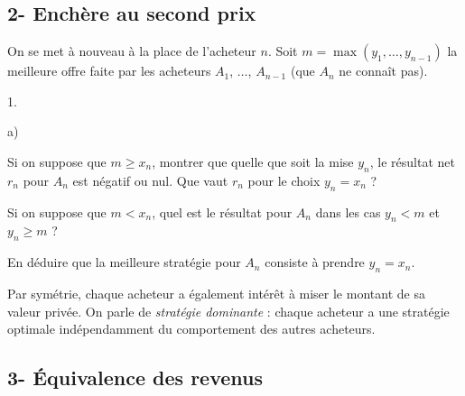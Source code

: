 \documentclass[11pt]{article}%
\begin{document}



\subsection*{2- Enchère au second prix}

\noindent
On se met à nouveau à la place de l'acheteur $n$. Soit $m = \max(y_1, 
\ldots, y_{n-1})$ la meilleure offre faite par les acheteurs $A_1$, 
$\ldots$, $A_{n-1}$ (que $A_n$ ne connaît pas).
\begin{noliste}{1.}
  \setlength{\itemsep}{4mm}
  \setcounter{enumi}{11}
  \item \begin{noliste}{a)}
    \setlength{\itemsep}{2mm}
    \item Si on suppose que $m \geq x_n$, montrer que quelle que soit la
    mise $y_n$, le résultat net $r_n$ pour $A_n$ est négatif ou nul. 
    Que vaut $r_n$ pour le choix $y_n = x_n$ ?
    
    

    
    \item Si on suppose que $m < x_n$, quel est le résultat pour $A_n$
    dans les cas $y_n < m$ et $y_n \geq m$ ?
    
    

    
    
    
    \item En déduire que la meilleure stratégie pour $A_n$ consiste 
    à prendre $y_n =x_n$.
    
    
  \end{noliste}
\end{noliste}
Par symétrie, chaque acheteur a également intérêt à miser le montant de 
sa valeur privée. On parle de \emph{stratégie dominante} : chaque 
acheteur a une stratégie optimale indépendamment du comportement des 
autres acheteurs.




\subsection*{3- Équivalence des revenus}
\end{document}
